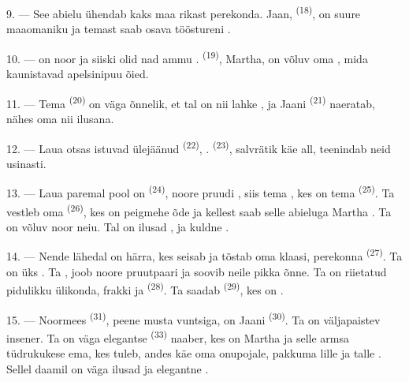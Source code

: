 9. --- See abielu ühendab kaks maa rikast perekonda. Jaan, 
\textsuperscript{(18)}, on suure maaomaniku  ja temast saab osava
tööstureni .

10. ---  on noor ja siiski olid nad ammu .
 \textsuperscript{(19)}, Martha, on võluv oma ,
mida kaunistavad apelsinipuu õied.

11. --- Tema  \textsuperscript{(20)} on väga õnnelik, et tal on nii lahke
, ja Jaani  \textsuperscript{(21)} naeratab, nähes oma
 nii ilusana.

12. --- Laua otsas istuvad ülejäänud  \textsuperscript{(22)},
. 
\textsuperscript{(23)}, salvrätik käe all, teenindab neid usinasti.

\VUsaut{3.0mm}

13. --- Laua paremal pool on  \textsuperscript{(24)}, noore pruudi
, siis tema , kes on tema 
\textsuperscript{(25)}. Ta vestleb oma  \textsuperscript{(26)}, kes
on peigmehe õde ja kellest saab selle abieluga Martha . Ta on võluv noor
neiu. Tal on ilusad ,  ja kuldne .

14. --- Nende lähedal on härra, kes seisab ja tõstab oma klaasi, perekonna
 \textsuperscript{(27)}. Ta on üks . Ta
, joob noore pruutpaari  ja soovib neile pikka
õnne. Ta on riietatud pidulikku ülikonda, frakki ja 
\textsuperscript{(28)}. Ta saadab  \textsuperscript{(29)}, kes on
.

15. --- Noormees  \textsuperscript{(31)}, peene musta vuntsiga, on Jaani
 \textsuperscript{(30)}. Ta on väljapaistev insener. Ta on väga elegantse
 \textsuperscript{(33)} naaber, kes on Martha  ja
selle armsa tüdrukukese ema, kes tuleb, andes käe oma onupojale, pakkuma lille ja
 talle . Sellel daamil on väga ilusad
 ja elegantne .

